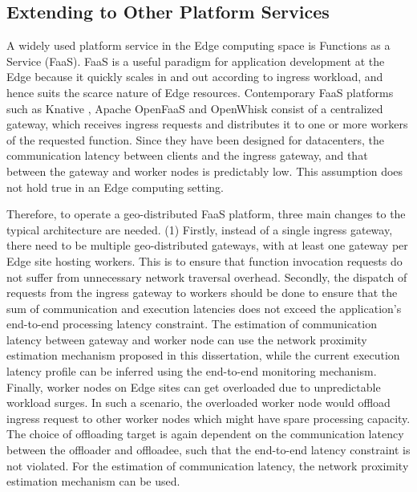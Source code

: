 \subsection{Extending to Other Platform Services}
A widely used platform service in the Edge computing space is Functions as a Service (FaaS). FaaS is a useful paradigm for application development at the Edge because it quickly scales in and out according to ingress workload, and hence suits the scarce nature of Edge resources. Contemporary FaaS platforms such as Knative \cite{knative}, Apache OpenFaaS \cite{openfaas} and OpenWhisk \cite{openwhisk} consist of a centralized gateway, which receives ingress requests and distributes it to one or more workers of the requested function. Since they have been designed for datacenters, the communication latency between clients and the ingress gateway, and that between the gateway and worker nodes is predictably low. This assumption does not hold true in an Edge computing setting.
\par Therefore, to operate a geo-distributed FaaS platform, three main changes to the typical architecture are needed. (1) Firstly, instead of a single ingress gateway, there need to be multiple geo-distributed gateways, with at least one gateway per Edge site hosting workers. This is to ensure that function invocation requests do not suffer from unnecessary network traversal overhead. Secondly, the dispatch of requests from the ingress gateway to workers should be done to ensure that the sum of communication and execution latencies does not exceed the application's end-to-end processing latency constraint. The estimation of communication latency between gateway and worker node can use the network proximity estimation mechanism proposed in this dissertation, while the current execution latency profile can be inferred using the end-to-end monitoring mechanism. Finally, worker nodes on Edge sites can get overloaded due to unpredictable workload surges. In such a scenario, the overloaded worker node would offload ingress request to other worker nodes which might have spare processing capacity. The choice of offloading target is again dependent on the communication latency between the offloader and offloadee, such that the end-to-end latency constraint is not violated. For the estimation of communication latency, the network  proximity estimation mechanism can be used.

